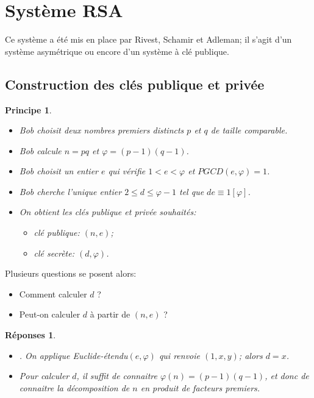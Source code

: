 \documentclass[12pt]{report}
\newtheorem*{reps}{Réponses}
\newtheorem*{prin}{Principe}
\begin{document}
\section{Système RSA}

Ce système a été mis en place par Rivest, Schamir et Adleman; il s'agit d'un système asymétrique ou encore d'un système à clé publique.


\subsection{Construction des clés publique et privée}



\begin{prin}\
\begin{itemize}
\item[•] Bob choisit deux nombres premiers distincts $p$ et $q$ de taille comparable.
\item[•] Bob calcule $n=pq$ et $\varphi=(p-1)(q-1)$.
\item[•] Bob choisit un entier $e$ qui vérifie $1<e< \varphi$ et $PGCD(e,\varphi)=1$.
\item[•] Bob cherche l'unique entier $2 \leq d \leq \varphi -1$ tel que $de \equiv 1 [\varphi]$.
\item[•] On obtient les clés publique et privée souhaités:
\begin{itemize}
\item[$\star$] clé publique: $(n,e)$;
\item[$\star$] clé secrète: $(d,\varphi)$.
\end{itemize}  
\end{itemize}
\end{prin}

Plusieurs questions se posent alors:
\begin{itemize}
\item[$1)$] Comment calculer $d$ ?
\item[$2)$] Peut-on calculer $d$ à partir de $(n,e)$ ?
\end{itemize}

\begin{reps}
\begin{itemize}
\item[$1)$] . On applique Euclide-étendu$(e,\varphi)$ qui renvoie $(1,x,y)$; alors $d=x$.
\item[$2)$] Pour calculer $d$, il suffit de connaitre $\varphi(n)=(p-1)(q-1)$, et donc de connaitre la décomposition de $n$ en produit de facteurs premiers.
\end{itemize}
\end{reps}
\end{document}
